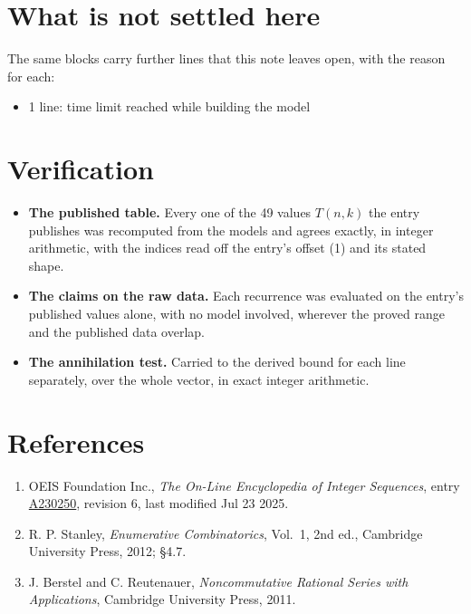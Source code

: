 \documentclass[11pt]{article}
\theoremstyle{definition}
\begin{document}
\section{What is not settled here}

The same blocks carry further lines that this note leaves open, with the reason for each:

\begin{itemize}

\item 1 line: time limit reached while building the model

\end{itemize}

\section{Verification}

\begin{itemize}

\item {\bfseries The published table.} Every one of the 49 values $T(n,k)$ the entry publishes was recomputed from the models and agrees exactly, in integer arithmetic, with the indices read off the entry's offset (1) and its stated shape.

\item {\bfseries The claims on the raw data.} Each recurrence was evaluated on the entry's published values alone, with no model involved, wherever the proved range and the published data overlap.

\item {\bfseries The annihilation test.} Carried to the derived bound for each line separately, over the whole vector, in exact integer arithmetic.

\end{itemize}

\section{References}

\begin{enumerate}

\item OEIS Foundation Inc., \emph{The On-Line Encyclopedia of Integer Sequences}, entry \href{https://oeis.org/A230250}{A230250}, revision 6, last modified Jul 23 2025.

\item R. P. Stanley, \emph{Enumerative Combinatorics}, Vol.~1, 2nd ed., Cambridge University Press, 2012; \S4.7.

\item J. Berstel and C. Reutenauer, \emph{Noncommutative Rational Series with Applications}, Cambridge University Press, 2011.

\end{enumerate}
\end{document}
